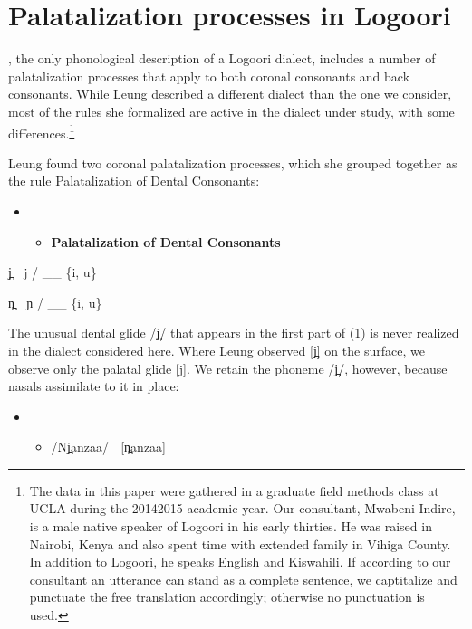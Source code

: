 \documentclass[output=paper]{langsci/langscibook}
\begin{document}
\section{Palatalization processes in Logoori} %

\citet{Leung1991}, the only phonological description of a Logoori dialect, includes a number of palatalization processes that apply to both coronal consonants and back consonants. While Leung described a different dialect than the one we consider, most of the rules she formalized are active in the dialect under study, with some differences.\footnote{   The data in this paper were gathered in a graduate field methods class at UCLA during the 20142015 academic year. Our consultant, Mwabeni Indire, is a male native speaker of Logoori in his early thirties. He was raised in Nairobi, Kenya and also spent time with extended family in Vihiga County. In addition to Logoori, he speaks English and Kiswahili. If according to our consultant an utterance can stand as a complete sentence, we captitalize and punctuate the free translation accordingly; otherwise no punctuation is used.} 

Leung found two coronal palatalization processes, which she grouped together as the rule Palatalization of Dental Consonants:

\setcounter{itemize}{0}
\begin{itemize}
\item \setcounter{itemize}{0}
\begin{itemize}
\item \textbf{Palatalization of Dental Consonants} \citep[117]{Leung1991}

\end{itemize}
\end{itemize}

j̪  j / \_\_ \{i, u\}

n̪  ɲ / \_\_ \{i, u\}

The unusual dental glide /j̪/ that appears in the first part of (1) is never realized in the dialect considered here. Where Leung observed [j̪] on the surface, we observe only the palatal glide [j]. We retain the phoneme /j̪/, however, because nasals assimilate to it in place:

\begin{itemize}
\item \setcounter{itemize}{0}
\begin{itemize}
\item /Nj̪anzaa/    [n̪anzaa]  

\end{itemize}
\end{itemize}
\end{document}
